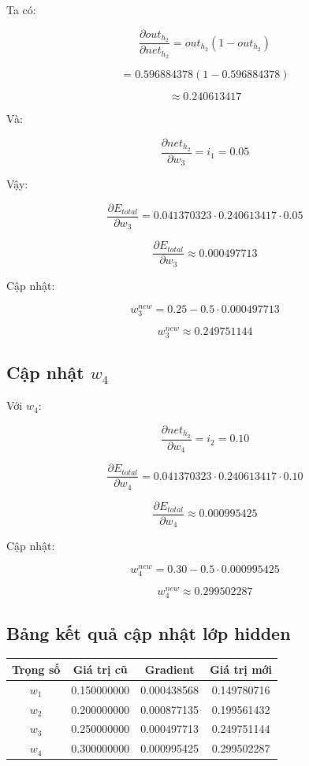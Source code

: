 Ta có:

\[
    \frac{\partial out_{h_2}}{\partial net_{h_2}}
    =
    out_{h_2}(1-out_{h_2})
\]

\[
    =
    0.596884378(1-0.596884378)
\]

\[
    \approx 0.240613417
\]

Và:

\[
    \frac{\partial net_{h_2}}{\partial w_3}=i_1=0.05
\]

Vậy:

\[
    \frac{\partial E_{total}}{\partial w_3}
    =
    0.041370323
    \cdot
    0.240613417
    \cdot
    0.05
\]

\[
    \frac{\partial E_{total}}{\partial w_3}
    \approx 0.000497713
\]

Cập nhật:

\[
    w_3^{new}
    =
    0.25
    -
    0.5\cdot 0.000497713
\]

\[
    w_3^{new}
    \approx 0.249751144
\]

\subsection{Cập nhật $w_4$}

Với $w_4$:

\[
    \frac{\partial net_{h_2}}{\partial w_4}=i_2=0.10
\]

\[
    \frac{\partial E_{total}}{\partial w_4}
    =
    0.041370323
    \cdot
    0.240613417
    \cdot
    0.10
\]

\[
    \frac{\partial E_{total}}{\partial w_4}
    \approx 0.000995425
\]

Cập nhật:

\[
    w_4^{new}
    =
    0.30
    -
    0.5\cdot 0.000995425
\]

\[
    w_4^{new}
    \approx 0.299502287
\]

\subsection{Bảng kết quả cập nhật lớp hidden}

\begin{center}
\begin{tabular}{cccc}
\toprule
Trọng số & Giá trị cũ & Gradient & Giá trị mới \\
\midrule
$w_1$ & 0.150000000 & 0.000438568 & 0.149780716 \\
$w_2$ & 0.200000000 & 0.000877135 & 0.199561432 \\
$w_3$ & 0.250000000 & 0.000497713 & 0.249751144 \\
$w_4$ & 0.300000000 & 0.000995425 & 0.299502287 \\
\bottomrule
\end{tabular}
\end{center}

